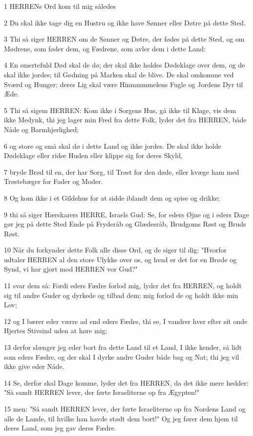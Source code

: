 \par 1 HERRENs Ord kom til mig således
\par 2 Du skal ikke tage dig en Hustru og ikke have Sønner eller Døtre på dette Sted.
\par 3 Thi så siger HERREN om de Sønner og Døtre, der fødes på dette Sted, og om Mødrene, som føder dem, og Fædrene, som avler dem i dette Land:
\par 4 En smertefuld Død skal de dø; der skal ikke holdes Dødeklage over dem, og de skal ikke jordes; til Gødning på Marken skal de blive. De skal omkomme ved Sværd og Hunger; deres Lig skal være Hinmmmmelens Fugle og Jordens Dyr til Æde.
\par 5 Thi så sigem HERREN: Kom ikke i Sorgens Hus, gå ikke til Klage, vis dem ikke Medynk, thi jeg lager min Fred fra dette Folk, lyder det fra HERREN, både Nåde og Barmhjerlighed;
\par 6 og store og små skal dø i dette Land og ikke jordes. De skal ikke holde Dødeklage eller ridse Huden eller klippe sig for deres Skyld,
\par 7 bryde Brød til en, der har Sorg, til Trøst for den døde, eller kvæge ham med Trøstebæger for Fader og Moder.
\par 8 Og kom ikke i et Gildehus for at sidde iblandt dem og spise og drikke;
\par 9 thi så siger Hærskarers HERRE, Israels Gud: Se, for eders Øjne og i eders Dage gør jeg på dette Sted Ende på Fryderåb og Glædesråb, Brudgoms Røst og Bruds Røst.
\par 10 Når du forkynder dette Folk alle disse Ord, og de siger til dig: "Hvorfor udtaler HERREN al den store Ulykke over os, og hvad er det for en Brøde og Synd, vi har gjort mod HERREN vor Gud?"
\par 11 svar dem så: Fordi eders Fædre forlod mig, lyder det fra HERREN, og holdt sig til andre Guder og dyrkede og tilbad dem; mig forlod de og holdt ikke min Lov;
\par 12 og I bærer eder værre ad end eders Fædre, thi se, I vandrer hver efter sit onde Hjertes Stivsind uden at høre mig;
\par 13 derfor slænger jeg eder bort fra dette Land til et Land, I ikke kender, så lidt som eders Fædre, og der skal I dyrke andre Guder både bag og Nat; thi jeg vil ikke give eder Nåde.
\par 14 Se, derfor skal Dage komme, lyder det fra HERREN, da det ikke mere hedder: "Så sandt HERREN lever, der førte Israeliterne op fra Ægypten!"
\par 15 men: "Så sandt HERREN lever, der førte Israeliterne op fra Nordens Land og alle de Lande, til hvilke han havde stødt dem bort!" Og jeg fører dem hjem til deres Land, som jeg gav deres Fædre.

